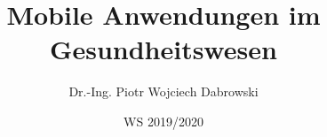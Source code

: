 \usepackage[utf8]{inputenc}
\usepackage[T1]{fontenc}


\title{Mobile Anwendungen im Gesundheitswesen}
\date{WS 2019/2020}
\author[PWD]{Dr.-Ing. Piotr Wojciech Dabrowski}

